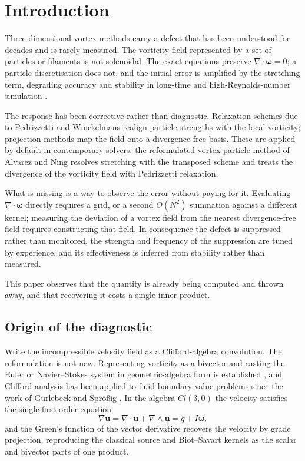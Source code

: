 \documentclass[preprint,12pt,3p]{elsarticle}
\theoremstyle{remark}
\newcommand{\bu}{\mathbf{u}}
\newcommand{\bomega}{\boldsymbol{\omega}}
\begin{document}
\section{Introduction}
\label{sec:intro}

Three-dimensional vortex methods carry a defect that has been understood for
decades and is rarely measured. The vorticity field represented by a set of
particles or filaments is not solenoidal. The exact equations preserve
$\nabla\cdot\bomega=0$; a particle discretisation does not, and the initial
error is amplified by the stretching term, degrading accuracy and stability in
long-time and high-Reynolds-number simulation \cite{cottet2000,winckelmans1993}.

The response has been corrective rather than diagnostic. Relaxation schemes due
to Pedrizzetti \cite{pedrizzetti1992} and Winckelmans \cite{winckelmans1993}
realign particle strengths with the local vorticity; projection methods map the
field onto a divergence-free basis. These are applied by default in
contemporary solvers: the reformulated vortex particle method of Alvarez and
Ning \cite{alvarez2024} resolves stretching with the transposed scheme and
treats the divergence of the vorticity field with Pedrizzetti relaxation.

What is missing is a way to observe the error without paying for it. Evaluating
$\nabla\cdot\bomega$ directly requires a grid, or a second $O(N^2)$ summation
against a different kernel; measuring the deviation of a vortex field from the
nearest divergence-free field requires constructing that field. In consequence
the defect is suppressed rather than monitored, the strength and frequency of
the suppression are tuned by experience, and its effectiveness is inferred from
stability rather than measured.

This paper observes that the quantity is already being computed and thrown
away, and that recovering it costs a single inner product.

\subsection{Origin of the diagnostic}

Write the incompressible velocity field as a Clifford-algebra convolution. The
reformulation is not new. Representing vorticity as a bivector and casting the
Euler or Navier--Stokes system in geometric-algebra form is established
\cite{hestenes1984,doran2003,sugon2024}, and Clifford analysis has been applied
to fluid boundary value problems since the work of Gürlebeck and Sprößig
\cite{gurlebeck1997book,sprossig1997}. In the algebra $Cl(3,0)$ the velocity
satisfies the single first-order equation
\begin{equation}
  \nabla\bu = \nabla\cdot\bu + \nabla\wedge\bu = q + I\bomega ,
  \label{eq:field}
\end{equation}
and the Green's function of the vector derivative recovers the velocity by
grade projection, reproducing the classical source and Biot--Savart kernels as
the scalar and bivector parts of one product.
\end{document}
